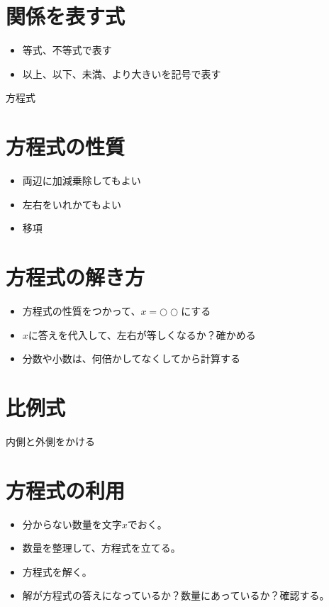 \documentclass[11pt]{article}
\begin{document}
\section{関係を表す式}
\begin{itemize}
\item 等式、不等式で表す
\item 以上、以下、未満、より大きいを記号で表す
\end{itemize}

\newpage

{\LARGE \noindent 方程式}

\section{方程式の性質}
\begin{itemize}
\item 両辺に加減乗除してもよい
\item 左右をいれかてもよい
\item 移項
\end{itemize}

\section{方程式の解き方}
\begin{itemize}
\item 方程式の性質をつかって、$x=○○$にする
\item $x$に答えを代入して、左右が等しくなるか？確かめる
\item 分数や小数は、何倍かしてなくしてから計算する
\end{itemize}

\section{比例式}
内側と外側をかける

\section{方程式の利用}
\begin{itemize}
\item 分からない数量を文字$x$でおく。
\item 数量を整理して、方程式を立てる。
\item 方程式を解く。
\item 解が方程式の答えになっているか？数量にあっているか？確認する。
\end{itemize}
\end{document}
